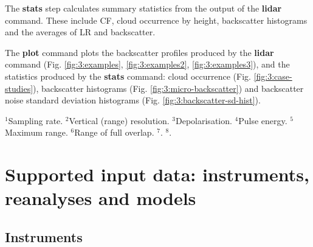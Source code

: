 The \textbf{stats} step calculates summary statistics from the output of the 
\textbf{lidar} command. These include CF, cloud occurrence by height,
backscatter histograms and the averages of LR and backscatter.

The \textbf{plot} command plots the backscatter profiles produced by the \textbf{lidar}
command (Fig. \ref{fig:3:examples}, \ref{fig:3:examples2}, \ref{fig:3:examples3}), and
the statistics produced by the \textbf{stats} command: cloud occurrence
(Fig. \ref{fig:3:case-studies}), backscatter histograms (Fig. \ref{fig:3:micro-backscatter})
and backscatter noise standard deviation histograms (Fig. \ref{fig:3:backscatter-sd-hist}).

\begin{table}[t]
\caption[Table of ALCs and their technical parameters]{Table of ALCs and their technical parameters. Power is calculated as Pulse$\times$Pulse Repetition Frequency (PRF).}
\label{tab:3:alcs}
\centering
{}
\footnotesize
$^1$Sampling rate.
$^2$Vertical (range) resolution.
$^3$Depolarisation.
$^4$Pulse energy.
$^5$Maximum range.
$^6$Range of full overlap.
$^7$\cite{hopkin2019}.
$^8$\cite{madonna2018}.
\normalsize
\end{table}

\section{Supported input data: instruments, reanalyses and models}
\label{sec:3:supported-alcs-reanalyses-and-models}

\subsection{Instruments}
\label{sec:3:alcs}

